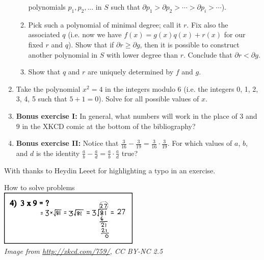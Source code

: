\documentclass[a4paper,10pt,titlepage]{article}
\theoremstyle{definition}
\begin{document}
\begin{enumerate}
\begin{enumerate}
            polynomials $ p_1, p_2, ... $ in $ S $ such that $ \partial p_1 > \partial p_2 > \cdots > \partial p_i > \cdots $).
      \item Pick such a polynomial of minimal degree; call it $ r $. Fix also the associated $ q $ (i.e. now we have $ f(x) = g(x) q(x) + r(x) $ for
            our fixed $ r $ and $ q $). Show that if $ \partial r \geq \partial g $, then it is possible to construct another polynomial in $ S $ with
            lower degree than $ r $. Conclude that $ \partial r < \partial g $.
      \item Show that $ q $ and $ r $ are uniquely determined by $ f $ and $ g $.
    \end{enumerate}
  \item Take the polynomial $ x^2 = 4 $ in the integers modulo 6 (i.e. the integers 0, 1, 2, 3, 4, 5
        such that $ 5 + 1 = 0 $). Solve for all possible values of $ x $.
  \item \textbf{Bonus exercise I:} In general, what numbers will work in the place of $ 3 $ and $ 9 $ in the XKCD
        comic at the bottom of the bibliography?
  \item \textbf{Bonus exercise II:} Notice that $ \frac{3}{16} - \frac{3}{19} = \frac{3}{16} \cdot \frac{3}{19} $.
        For which values of $ a $, $ b $, and $ d $ is the identity $ \frac{a}{b} - \frac{a}{d} = \frac{a}{b} \cdot \frac{a}{d} $ true?
\end{enumerate}

\newpage
\nocite{*}
\printbibliography[title=Bibliography and Further Reading, heading=bibnumbered]

With thanks to Heydin Leeet for highlighting a typo in an exercise.

\vspace{\fill}

\begin{center}
  How to solve problems\\
  \includegraphics[width=0.5\textwidth]{3x9}\\
  \small{\textit{Image from \url{http://xkcd.com/759/}, CC BY-NC 2.5}}
\end{center}
\end{document}

